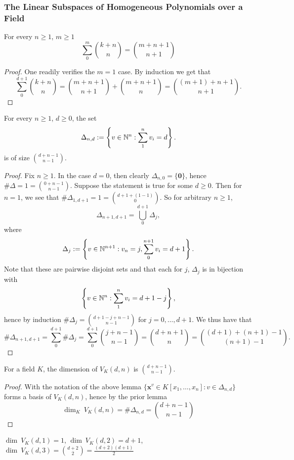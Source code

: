 \subsubsection{The Linear Subspaces of Homogeneous Polynomials over a Field}
\begin{lemma}\label{SimpleBinomialLemma}
    For every $n\geq 1$, $m\geq 1$
    $$\sum_0^m {k +n \choose n} = {m+n+1\choose n+1}$$
\end{lemma}
\begin{proof}
    One readily verifies the $m=1$ case. By induction we get that
    $$\sum_0^{d+1} {k+n\choose n} = {m+n+1\choose n+1}+ {m+n +1\choose n} = {(m+1)+n+1\choose n+1}.$$
\end{proof}
\begin{lemma}\label{NumberOfWaysOfPickingNnumbsersSummingToD}
    For every $n\geq 1$, $d\geq 0$, the set  
    $$\Delta_{n,d}:=\left\{v\in \mathbb{N}^n : \sum_1^n v_i=d\right\}.$$
    is of size ${d+n-1\choose n-1}$.
\end{lemma}
\begin{proof}
    Fix $n\geq 1$. In the case $d=0$, then clearly $\Delta_{n,0} = \{\textbf{0}\}$, hence $\#\Delta =1={0+n-1\choose n-1}.$
    Suppose the statement is true for some $d\geq 0$. Then for $n=1$, we see that $\#\Delta_{1,d+1} = 1 = { d +1 +(1-1) \choose 0}$. So for arbitrary $n\geq 1$,
    $$\Delta_{n+1,d+1} =\bigcup_0^{d+1} \Delta_j,$$
    where 
    $$\Delta_j := \left\{ v\in \mathbb{N}^{n+1}: v_{n} = j, \sum_0^{n+1} v_i = d+1 \right\}.$$
    Note that these are pairwise disjoint sets and that each for $j$, $\Delta_j$ is in bijection with 
    $$\left\{ v\in \mathbb{N}^{n} : \sum_1^n v_i = d+1-j \right\},$$
    hence by induction $\#\Delta_j = {d+1-j+n-1 \choose n-1}$ for $j=0,\dots, d+1$. We thus have that 
    $$\#\Delta_{n+1,d+1} = \sum_0^{d+1} \#\Delta_j = \sum_0^{d+1} {j+n-1 \choose n-1} = {d+n+1 \choose n} = {(d+1)+(n+1)-1\choose (n+1)-1}.$$
\end{proof}
\begin{proposition}\label{DimensionOfVectorSpaceOfHomogeneousPolynomialsOfDegreeDInNVariables}
    For a field $K$, the dimension of $V_K(d,n)$ is ${d+n-1 \choose n-1}$.
\end{proposition}
\begin{proof}
    With the notation of the above lemma $\{ \mathbf{x}^v \in K[x_1,\dots,x_n] : v\in \Delta_{n,d}\}$ forms a basis of $V_K(d,n)$, hence by the prior lemma
    $$\dim_K \ V_K(d,n) = \#\Delta_{n,d}= {d+n-1 \choose n-1}$$
\end{proof}
\begin{example}
    $\dim\ V_K(d,1)=1$, $\dim\ V_K(d,2)=d+1$, $\dim\ V_K(d,3) = {d+2\choose 2} = \frac{(d+2)(d+1)}{2}$
\end{example}
